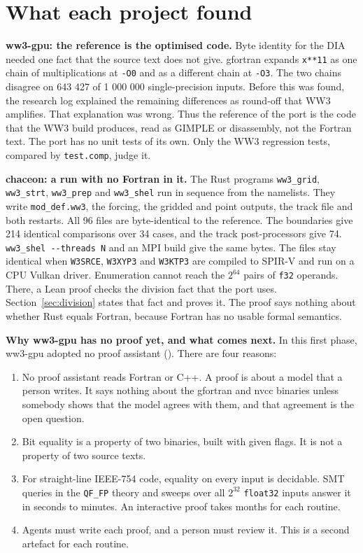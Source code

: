 \documentclass[10pt,a4paper,]{article}
\providecommand{\tightlist}{\setlength{\itemsep}{0pt}\setlength{\parskip}{0pt}}
\begin{document}
\section{What each project found}\label{sec:found}

\textbf{ww3-gpu: the reference is the optimised code.} Byte identity for
the DIA needed one fact that the source text does not give. gfortran
expands \texttt{x**11} as one chain of multiplications at \texttt{-O0}
and as a different chain at \texttt{-O3}. The two chains disagree on 643
427 of 1 000 000 single-precision inputs. Before this was found, the
research log explained the remaining differences as round-off that WW3
amplifies. That explanation was wrong. Thus the reference of the port is
the code that the WW3 build produces, read as GIMPLE or disassembly, not
the Fortran text. The port has no unit tests of its own. Only the WW3
regression tests, compared by \texttt{test.comp}, judge it.

\textbf{chaceon: a run with no Fortran in it.} The Rust programs
\texttt{ww3\_grid}, \texttt{ww3\_strt}, \texttt{ww3\_prep} and
\texttt{ww3\_shel} run in sequence from the namelists. They write
\texttt{mod\_def.ww3}, the forcing, the gridded and point outputs, the
track file and both restarts. All 96 files are byte-identical to the
reference. The boundaries give 214 identical comparisons over 34 cases,
and the track post-processors give 74.
\texttt{ww3\_shel\ -\/-threads\ N} and an MPI build give the same bytes.
The files stay identical when \texttt{W3SRCE}, \texttt{W3XYP3} and
\texttt{W3KTP3} are compiled to SPIR-V and run on a CPU Vulkan driver.
Enumeration cannot reach the \(2^{64}\) pairs of \texttt{f32} operands.
There, a Lean proof checks the division fact that the port uses.
Section~\ref{sec:division} states that fact and proves it. The proof
says nothing about whether Rust equals Fortran, because Fortran has no
usable formal semantics.

\textbf{Why ww3-gpu has no proof yet, and what comes next.} In this
first phase, ww3-gpu adopted no proof assistant
(). There are four reasons:

\begin{enumerate}
\def\labelenumi{\arabic{enumi}.}
\tightlist
\item
  No proof assistant reads Fortran or C++. A proof is about a model that
  a person writes. It says nothing about the gfortran and nvcc binaries
  unless somebody shows that the model agrees with them, and that
  agreement is the open question.
\item
  Bit equality is a property of two binaries, built with given flags. It
  is not a property of two source texts.
\item
  For straight-line IEEE-754 code, equality on every input is decidable.
  SMT queries in the \texttt{QF\_FP} theory and sweeps over all
  \(2^{32}\) \texttt{float32} inputs answer it in seconds to minutes. An
  interactive proof takes months for each routine.
\item
  Agents must write each proof, and a person must review it. This is a
  second artefact for each routine.
\end{enumerate}
\end{document}
